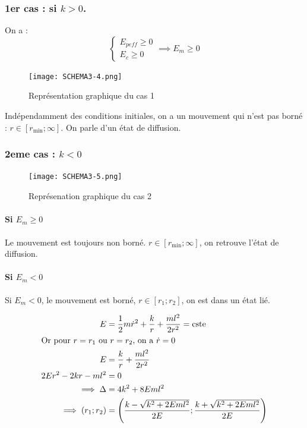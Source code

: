\subsubsection{1er cas : si \(k>0\).}
On a : 
\[
    \begin{cases}
        E_{p eff} \geq 0 \\
        E_{c} \geq 0
    \end{cases}
    \implies E_{m} \geq 0
\]
\begin{figure}[!htb]
    \centering
    \texttt{[image: SCHEMA3-4.png]}
    \caption{Représentation graphique du cas 1}
    \label{fig:SCHEMA3-4}
\end{figure}

Indépendamment des conditions initiales, on a un mouvement qui n'est pas borné : \(r \in \left[ r_{\min} ; \infty \right]\). On parle d'un état de diffusion. 
\newpage
\subsubsection{2eme cas : \(k<0\)}

\begin{figure}[!htb]
    \centering
    \texttt{[image: SCHEMA3-5.png]}
    \caption{Représenation graphique du cas 2}
    \label{fig:SCHEMA3-5}
\end{figure}



\paragraph{Si \(E_{m} \geq 0\)}
Le mouvement est toujours non borné. \(r \in \left[ r_{\min} ; \infty \right]\), on retrouve l'état de diffusion.
\paragraph{Si \(E_{m} < 0 \) }
Si \(E_{m} <0 \), le mouvement est borné, \(r \in \left[ r_{1}; r_{2} \right]\), on est dans un état lié.
\begin{corollary}[Calcul de \(r_{1}\) et \(r_{2}\)  ]
    \begin{align*}
        E &= \frac{1}{2}m\dot{r}^{2} + \frac{k}{r} + \frac{ml^{2}}{2r^{2}} = \text{cste} \\
        \intertext{Or pour \(r = r_{1}\) ou \(r=r_{2}\), on a \(\dot{r}=0\)}
        E &= \frac{k}{r} + \frac{ml^{2}}{2r^{2}} \\
        2Er^{2}-2kr - ml^{2} &= 0 \\
        \implies \Delta &= 4k^{2}+8Eml^{2} \\
        \implies \left(r_{1}; r_{2}\right) &= \left( \frac{k - \sqrt{k^{2}+2Eml^{2}}}{2E} ; \frac{k+\sqrt{k^{2} + 2Eml^{2}}}{2E} \right)
    \end{align*}
\end{corollary}

